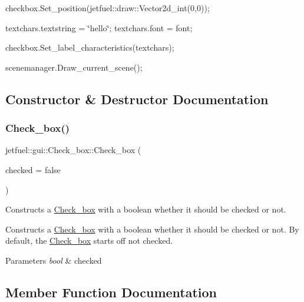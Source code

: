 checkbox.\+Set\+\_\+position(jetfuel\+::draw\+::\+Vector2d\+\_\+int(0,0));

textchars.\+textstring = \char`\"{}hello\char`\"{}; textchars.\+font = font;

checkbox.\+Set\+\_\+label\+\_\+characteristics(textchars);

scenemanager.\+Draw\+\_\+current\+\_\+scene(); 

\subsection{Constructor \& Destructor Documentation}
\mbox{\label{classjetfuel_1_1gui_1_1Check__box_a1e0e07940cfa643c1f019830042553bd}} 
\subsubsection{\texorpdfstring{Check\+\_\+box()}{Check\_box()}}
{\footnotesize\ttfamily jetfuel\+::gui\+::\+Check\+\_\+box\+::\+Check\+\_\+box (\begin{DoxyParamCaption}\item[{const bool}]{checked = {\ttfamily false} }\end{DoxyParamCaption})}



Constructs a \hyperlink{classjetfuel_1_1gui_1_1Check__box}{Check\+\_\+box} with a boolean whether it should be checked or not. 

Constructs a \hyperlink{classjetfuel_1_1gui_1_1Check__box}{Check\+\_\+box} with a boolean whether it should be checked or not. By default, the \hyperlink{classjetfuel_1_1gui_1_1Check__box}{Check\+\_\+box} starts off not checked.


\begin{DoxyParams}{Parameters}
{\em bool} & checked \\
\hline
\end{DoxyParams}


\subsection{Member Function Documentation}
\mbox{\label{classjetfuel_1_1gui_1_1Check__box_a544261fc2f2d182b73c7ea629fa35e78}} 
